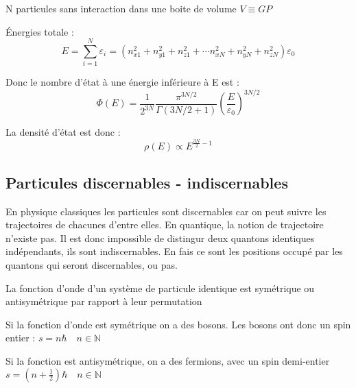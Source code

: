 \documentclass[12pt,a4paper]{report}
\newcommand{\ens}[1]{\mathbb{#1}}
\begin{document}
N particules sans interaction dans une boite de volume \( V \equiv GP\)

Énergies totale :
\[
	E = \sum_{i = 1}^N \varepsilon_i = (n_{x1}^2 + n_{y1}^2 + n_{z1}^2 + \cdots n_{xN}^2 + n_{yN}^2 + n_{zN}^2)\varepsilon_0
\]

Donc le nombre d'état à  une énergie inférieure à E est :
\[
	\Phi(E) = \dfrac{1}{2^{3N}} \dfrac{\pi^{3N/2}}{\Gamma(3N/2 + 1)} \left( \dfrac{E}{\varepsilon_0}\right)^{3N/2}
\]

La densité d'état est donc :
\[
	\rho(E) \propto E^{\frac{3N}{2} - 1}
\]

\subsection{Particules discernables - indiscernables}

En physique classiques les particules sont discernables car on peut suivre les trajectoires de chacunes d'entre elles.
En quantique, la notion de trajectoire n'existe pas.
Il est donc impossible de distingur deux quantons identiques indépendants, ils sont indiscernables.
En fais ce sont les positions occupé par les quantons qui seront discernables, ou pas.

La fonction d'onde d'un système de particule identique est symétrique ou antisymétrique par rapport à leur permutation

Si la fonction d'onde est symétrique on a des bosons.
Les bosons ont donc un spin entier : \(s = n \hbar \quad  n \in \ens{N}\)

Si la fonction est antisymétrique, on a des fermions, avec un spin demi-entier \(s = (n + \frac{1}{2}) \hbar \quad n \in \ens{N}\)
\end{document}
